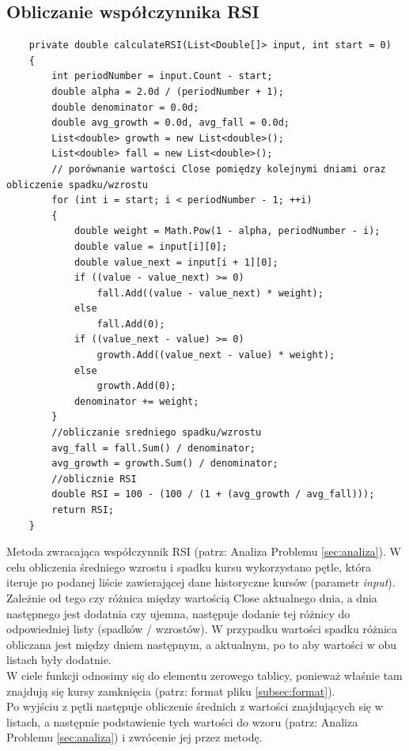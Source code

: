 \documentclass[a4paper]{article}
\begin{document}
	\subsection{Obliczanie współczynnika RSI}
	\begin{lstlisting}
	private double calculateRSI(List<Double[]> input, int start = 0)
	{
		int periodNumber = input.Count - start;
		double alpha = 2.0d / (periodNumber + 1);
		double denominator = 0.0d;
		double avg_growth = 0.0d, avg_fall = 0.0d;
		List<double> growth = new List<double>();
		List<double> fall = new List<double>();
		// porównanie wartości Close pomiędzy kolejnymi dniami oraz obliczenie spadku/wzrostu
		for (int i = start; i < periodNumber - 1; ++i)
		{
			double weight = Math.Pow(1 - alpha, periodNumber - i);
			double value = input[i][0];
			double value_next = input[i + 1][0];
			if ((value - value_next) >= 0)
				fall.Add((value - value_next) * weight);
			else
				fall.Add(0);
			if ((value_next - value) >= 0)
				growth.Add((value_next - value) * weight);
			else
				growth.Add(0);
			denominator += weight;
		}
		//obliczanie sredniego spadku/wzrostu
		avg_fall = fall.Sum() / denominator;
		avg_growth = growth.Sum() / denominator;
		//oblicznie RSI
		double RSI = 100 - (100 / (1 + (avg_growth / avg_fall)));
		return RSI;
	}
	\end{lstlisting}\indent\indent
	Metoda zwracająca współczynnik RSI (patrz: Analiza Problemu \ref{sec:analiza}). W celu obliczenia średniego wzrostu i spadku kursu wykorzystano pętle, która iteruje po podanej liście zawierającej dane historyczne kursów (parametr \emph{input}). Zależnie od tego czy różnica między wartością Close aktualnego dnia, a dnia następnego jest dodatnia czy ujemna, następuje dodanie tej różnicy do odpowiedniej listy (spadków / wzrostów). W przypadku wartości spadku różnica obliczana jest między dniem następnym, a aktualnym, po to aby wartości w obu listach były dodatnie.\\\indent
	W ciele funkcji odnosimy się do elementu zerowego tablicy, ponieważ właśnie tam znajdują się kursy zamknięcia (patrz: format pliku \ref{subsec:format}).\\\indent
	Po wyjściu z pętli następuje obliczenie średnich z wartości znajdujących się w listach, a następnie podstawienie tych wartości do wzoru (patrz: Analiza Problemu \ref{sec:analiza}) i zwrócenie jej przez metodę.
	\newpage
\end{document}
